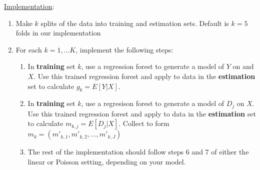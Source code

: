 \documentclass[11pt]{article}
\begin{document}
\noindent \underline{Implementation}:
\begin{enumerate}
	\item Make $k$  splits of the data into training and estimation sets. Default is $k = 5$ folds in our implementation

	\item For each $k = 1, ... K$, implement the following steps:
  \begin{enumerate}
    \item In \textbf{training} set $k$, use a regression forest to generate a model of $Y$ on and $X$. Use this trained regression forest and apply to data in the \textbf{estimation} set to calculate $g_k = E[Y|X]$.
    \item In \textbf{training} set $k$, use a regresison forest to generate a model of $D_j$ on $X$. Use this trained regression forest and apply to data in the \textbf{estimation} set to calculate $m_{k, j} = E[D_j|X]$. Collect to form $m_k = (m'_{k,1}, m'_{k,2}, . . ., m'_{k, J})$
    \item The rest of the implementation should follow steps 6 and 7 of either the linear or Poisson setting, depending on your model.
  \end{enumerate}
\end{enumerate}
\end{document}
